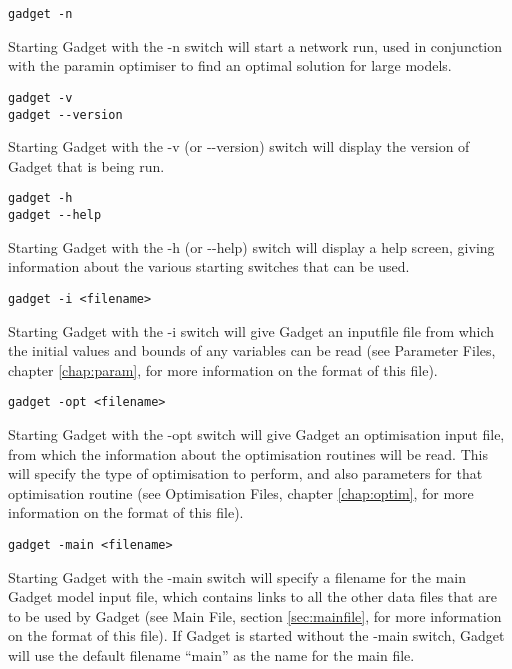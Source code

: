 \documentclass[]{book}
\begin{document}
\begin{verbatim}
gadget -n
\end{verbatim}

Starting Gadget with the -n switch will start a network run, used in
conjunction with the paramin optimiser to find an optimal solution for
large models.

\begin{verbatim}
gadget -v
gadget --version
\end{verbatim}

Starting Gadget with the -v (or -\/-version) switch will display the
version of Gadget that is being run.

\begin{verbatim}
gadget -h
gadget --help
\end{verbatim}

Starting Gadget with the -h (or -\/-help) switch will display a help
screen, giving information about the various starting switches that can
be used.

\begin{verbatim}
gadget -i <filename>
\end{verbatim}

Starting Gadget with the -i switch will give Gadget an inputfile file
from which the initial values and bounds of any variables can be read
(see Parameter Files, chapter \ref{chap:param}, for more information on the format of this
file).

\begin{verbatim}
gadget -opt <filename>
\end{verbatim}

Starting Gadget with the -opt switch will give Gadget an optimisation
input file, from which the information about the optimisation routines
will be read. This will specify the type of optimisation to perform, and
also parameters for that optimisation routine (see Optimisation Files,
chapter \ref{chap:optim},
for more information on the format of this file).

\begin{verbatim}
gadget -main <filename>
\end{verbatim}

Starting Gadget with the -main switch will specify a filename for the
main Gadget model input file, which contains links to all the other data
files that are to be used by Gadget (see Main File,
section \ref{sec:mainfile}, for more information on the format of this
file). If Gadget is started without the -main switch, Gadget will use
the default filename ``main'' as the name for the main file.
\end{document}
